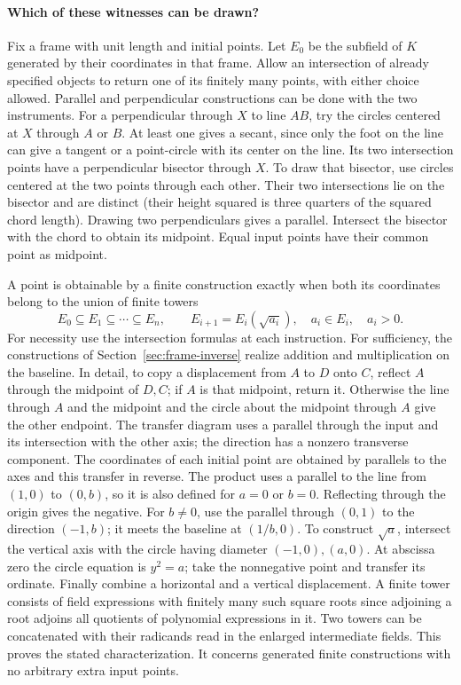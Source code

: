 \paragraph{Which of these witnesses can be drawn?}
Fix a frame with unit length and initial points. Let $E_0$ be the
subfield of $K$ generated by their coordinates in that frame.
Allow an intersection of already specified objects to return one of
its finitely many points, with either choice allowed. Parallel and
perpendicular constructions can be done with the two instruments.
For a perpendicular through $X$ to line $AB$, try the circles centered
at $X$ through $A$ or $B$. At least one gives a secant, since only the
foot on the line can give a tangent or a point-circle with its center on
the line. Its two intersection points have a perpendicular bisector
through $X$. To draw that bisector, use circles centered at the two
points through each other. Their two intersections lie on the bisector
and are distinct (their height squared is three quarters of the squared
chord length). Drawing two perpendiculars gives a parallel. Intersect
the bisector with the chord to obtain its midpoint. Equal input points have their common point as midpoint.

A point is obtainable by a finite construction exactly when both its
coordinates belong to the union of finite towers
\[
 E_0\subseteq E_1\subseteq\cdots\subseteq E_n,
 \qquad E_{i+1}=E_i(\sqrt{a_i}),\quad a_i\in E_i,\quad a_i>0.
\]
For necessity use the intersection formulas at each instruction.
For sufficiency, the constructions of Section~\ref{sec:frame-inverse}
realize addition and multiplication on the baseline. In detail, to copy
a displacement from $A$ to $D$ onto $C$, reflect $A$ through the midpoint
of $D,C$; if $A$ is that midpoint, return it. Otherwise the line
through $A$ and the midpoint and the circle about the midpoint through
$A$ give the other endpoint. The transfer diagram uses a parallel through
the input and its intersection with the other axis; the direction has
a nonzero transverse component. The coordinates of each initial point are obtained by parallels to the axes and this transfer in reverse. The product uses a parallel to the line
from $(1,0)$ to $(0,b)$, so it is also defined for $a=0$ or $b=0$.
Reflecting through the origin gives the negative. For $b\ne0$,
use the parallel through $(0,1)$ to the direction $(-1,b)$;
it meets the baseline at $(1/b,0)$. To construct $\sqrt a$, intersect
the vertical axis with the circle having diameter $(-1,0),(a,0)$.
At abscissa zero the circle equation is $y^2=a$; take the nonnegative
point and transfer its ordinate. Finally combine a horizontal and a
vertical displacement. A finite tower consists of field expressions
with finitely many such square roots since adjoining a root adjoins all
quotients of polynomial expressions in it. Two towers can be concatenated
with their radicands read in the enlarged intermediate fields.
This proves the stated characterization. It concerns generated finite
constructions with no arbitrary extra input points.

